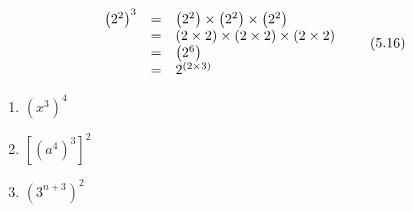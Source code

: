     \begin{equation}
    \begin{array}{ccc}\hfill {\left({2}^{2}\right)}^{3}& =& \left({2}^{2}\right)\ensuremath{\times}\left({2}^{2}\right)\ensuremath{\times}\left({2}^{2}\right)\hfill \\ & =& \left(2\ensuremath{\times}2\right)\ensuremath{\times}\left(2\ensuremath{\times}2\right)\ensuremath{\times}\left(2\ensuremath{\times}2\right)\hfill \\ & =& \left({2}^{6}\right)\hfill \\ & =& {2}^{\left(2\ensuremath{\times}3\right)}\hfill \end{array}\tag{5.16}
      \end{equation}
\label{m38359*secfhsst!!!underscore!!!id1894}
            \nopagebreak
        \label{m38359*id66924}\begin{enumerate}[noitemsep, label=\textbf{\arabic*}. ] 
            \label{m38359*uid36}\item 
            ${\left({x}^{3}\right)}^{4}$
      \label{m38359*uid37}\item 
        ${\left[{\left({a}^{4}\right)}^{3}\right]}^{2}$
      \label{m38359*uid38}\item 
        ${\left({3}^{n+3}\right)}^{2}$
\newline
\newline
          \end{enumerate}
\label{m38359*eip-323}\par
            \label{m38359*secfhsst!!!underscore!!!id41}\vspace{.5cm} 
      \noindent
